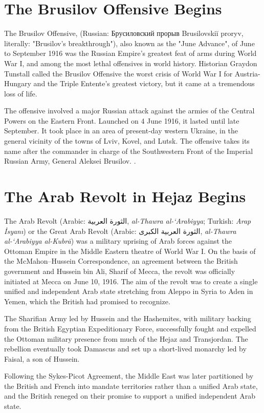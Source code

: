 \documentclass[a4paper,]{book}
\begin{document}
\section{The Brusilov Offensive Begins}

The Brusilov Offensive, (Russian: Брусиловский прорыв Brusilovskiĭ proryv, literally: "Brusilov's breakthrough"), also known as the "June Advance", of June to September 1916 was the Russian Empire's greatest feat of arms during World War I, and among the most lethal offensives in world history. Historian Graydon Tunstall called the Brusilov Offensive the worst crisis of World War I for Austria-Hungary and the Triple Entente's greatest victory, but it came at a tremendous loss of life.

The offensive involved a major Russian attack against the armies of the Central Powers on the Eastern Front. Launched on 4 June 1916, it lasted until late September. It took place in an area of present-day western Ukraine, in the general vicinity of the towns of Lviv, Kovel, and Lutsk. The offensive takes its name after the commander in charge of the Southwestern Front of the Imperial Russian Army, General Aleksei Brusilov. . 

\section{The Arab Revolt in Hejaz Begins}

The Arab Revolt (Arabic: الثورة العربية‎, \textit{al-Thawra al-‘Arabiyya}; Turkish: \textit{Arap İsyanı}) or the Great Arab Revolt (Arabic: الثورة العربية الكبرى‎, \textit{al-Thawra al-‘Arabiyya al-Kubrā}) ‎was a military uprising of Arab forces against the Ottoman Empire in the Middle Eastern theatre of World War I. On the basis of the McMahon–Hussein Correspondence, an agreement between the British government and Hussein bin Ali, Sharif of Mecca, the revolt was officially initiated at Mecca on June 10, 1916. The aim of the revolt was to create a single unified and independent Arab state stretching from Aleppo in Syria to Aden in Yemen, which the British had promised to recognize.

The Sharifian Army led by Hussein and the Hashemites, with military backing from the British Egyptian Expeditionary Force, successfully fought and expelled the Ottoman military presence from much of the Hejaz and Transjordan. The rebellion eventually took Damascus and set up a short-lived monarchy led by Faisal, a son of Hussein.

Following the Sykes-Picot Agreement, the Middle East was later partitioned by the British and French into mandate territories rather than a unified Arab state, and the British reneged on their promise to support a unified independent Arab state. 
\end{document}
